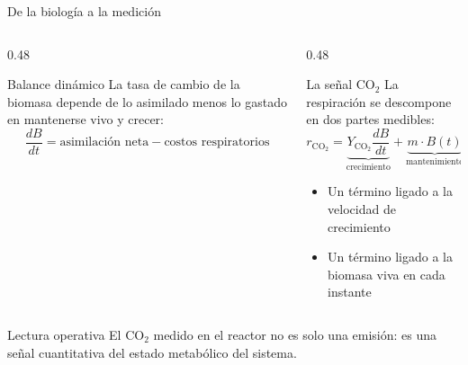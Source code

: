 \documentclass[aspectratio=169, 11pt]{beamer}
\begin{document}
\begin{frame}{De la biolog\'{i}a a la medici\'{o}n}
\begin{columns}[T]
\begin{column}{0.48\textwidth}
\begin{block}{Balance din\'{a}mico}
La tasa de cambio de la biomasa depende de lo asimilado menos lo gastado en mantenerse vivo y crecer:
\begin{equation*}
\frac{dB}{dt} = \text{asimilaci\'{o}n neta} - \text{costos respiratorios}
\end{equation*}
\end{block}
\end{column}
\begin{column}{0.48\textwidth}
\begin{exampleblock}{La se\~{n}al CO$_2$}
La respiraci\'{o}n se descompone en dos partes medibles:
\begin{equation*}
r_{\text{CO}_2} = \underbrace{Y_{\text{CO}_2}\frac{dB}{dt}}_{\text{crecimiento}} + \underbrace{m \cdot B(t)}_{\text{mantenimiento}}
\end{equation*}
\vspace{0.1cm}
\begin{itemize}
    \item Un t\'{e}rmino ligado a la velocidad de crecimiento
    \item Un t\'{e}rmino ligado a la biomasa viva en cada instante
\end{itemize}
\end{exampleblock}
\end{column}
\end{columns}
\vfill
\begin{alertblock}{Lectura operativa}
El CO$_2$ medido en el reactor no es solo una emisi\'{o}n: es una se\~{n}al cuantitativa del estado metab\'{o}lico del sistema.
\end{alertblock}
\end{frame}
\end{document}
